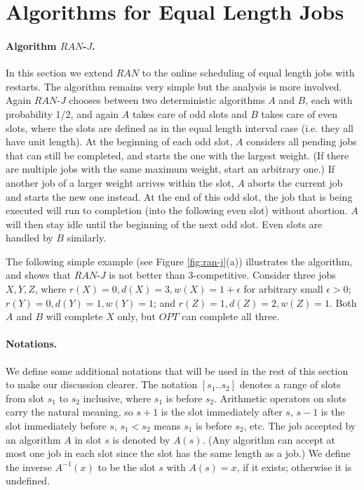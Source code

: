 \documentclass[11pt]{article}
\begin{document}
\section{Algorithms for Equal Length Jobs}

\paragraph{Algorithm $RAN$-$J$.}
In this section we extend $RAN$ to the online scheduling of 
equal length jobs with restarts.
The algorithm remains very simple but the analysis is more involved.
Again $RAN$-$J$ chooses between two deterministic algorithms $A$ and $B$, 
each with probability 1/2, and again
$A$ takes care of odd slots and $B$ takes care of even slots,
where the slots are defined as in the equal length interval case
(i.e. they all have unit length).  
At the beginning of each odd slot, $A$ considers all pending jobs that can 
still be completed, and starts the one with the largest weight.
(If there are multiple jobs with the same maximum weight, start an 
arbitrary one.)
If another job of a larger weight arrives within the slot, 
$A$ aborts the current job and starts the new one instead.  
At the end of this odd slot, the job that is being executed will run to
completion (into the following even slot) without abortion.
$A$ will then stay idle until the beginning of the next odd slot.
Even slots are handled by $B$ similarly.

The following simple example (see Figure \ref{fig:ran-j}(a))  
illustrates the algorithm, and shows that 
$RAN$-$J$ is not better than 3-competitive. 
Consider three jobs $X, Y, Z$, where $r(X)=0, d(X)=3, w(X)=1+\epsilon$ for
arbitrary small $\epsilon>0$;
$r(Y)=0, d(Y)=1, w(Y)=1$; and
$r(Z)=1, d(Z)=2, w(Z)=1$.
Both $A$ and $B$ will complete $X$ only, but $OPT$ can complete all three.

\paragraph{Notations.}
We define some additional notations that will be used in the rest of 
this section to make our discussion clearer.
The notation $[s_1..s_2]$ denotes a range of slots 
from slot $s_1$ to $s_2$ inclusive, where $s_1$ is before $s_2$.
Arithmetic operators on slots carry the natural meaning,
so $s+1$ is the slot immediately after $s$,
$s-1$ is the slot immediately before $s$, $s_1 < s_2$
means $s_1$ is before $s_2$, etc.
The job accepted by an algorithm $A$ in slot $s$ is denoted by $A(s)$.
(Any algorithm can accept at most one job in each slot since the slot has
the same length as a job.)
We define the inverse $A^{-1}(x)$ to be the slot $s$ with $A(s)=x$, 
if it exists; otherwise it is undefined.
\end{document}
